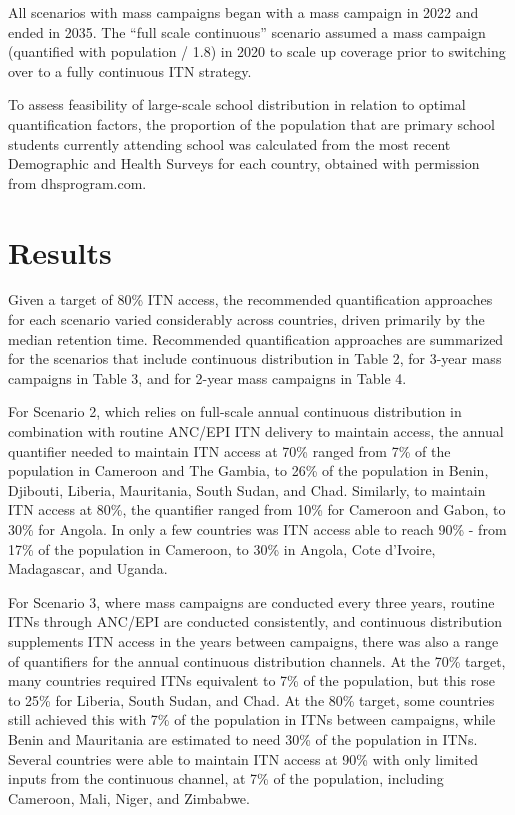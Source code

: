 \documentclass[review,
3p]{elsarticle} %
\begin{document}
All scenarios with mass campaigns began with a mass campaign in 2022 and
ended in 2035. The ``full scale continuous'' scenario assumed a mass
campaign (quantified with population / 1.8) in 2020 to scale up coverage
prior to switching over to a fully continuous ITN strategy.

To assess feasibility of large-scale school distribution in relation to
optimal quantification factors, the proportion of the population that
are primary school students currently attending school was calculated
from the most recent Demographic and Health Surveys for each country,
obtained with permission from dhsprogram.com.

\hypertarget{results}{%
\section{Results}\label{results}}

Given a target of 80\% ITN access, the recommended quantification
approaches for each scenario varied considerably across countries,
driven primarily by the median retention time. Recommended
quantification approaches are summarized for the scenarios that include
continuous distribution in Table 2, for 3-year mass campaigns in Table
3, and for 2-year mass campaigns in Table 4.

For Scenario 2, which relies on full-scale annual continuous
distribution in combination with routine ANC/EPI ITN delivery to
maintain access, the annual quantifier needed to maintain ITN access at
70\% ranged from 7\% of the population in Cameroon and The Gambia, to
26\% of the population in Benin, Djibouti, Liberia, Mauritania, South
Sudan, and Chad. Similarly, to maintain ITN access at 80\%, the
quantifier ranged from 10\% for Cameroon and Gabon, to 30\% for Angola.
In only a few countries was ITN access able to reach 90\% - from 17\% of
the population in Cameroon, to 30\% in Angola, Cote d'Ivoire,
Madagascar, and Uganda.

For Scenario 3, where mass campaigns are conducted every three years,
routine ITNs through ANC/EPI are conducted consistently, and continuous
distribution supplements ITN access in the years between campaigns,
there was also a range of quantifiers for the annual continuous
distribution channels. At the 70\% target, many countries required ITNs
equivalent to 7\% of the population, but this rose to 25\% for Liberia,
South Sudan, and Chad. At the 80\% target, some countries still achieved
this with 7\% of the population in ITNs between campaigns, while Benin
and Mauritania are estimated to need 30\% of the population in ITNs.
Several countries were able to maintain ITN access at 90\% with only
limited inputs from the continuous channel, at 7\% of the population,
including Cameroon, Mali, Niger, and Zimbabwe.
\end{document}
